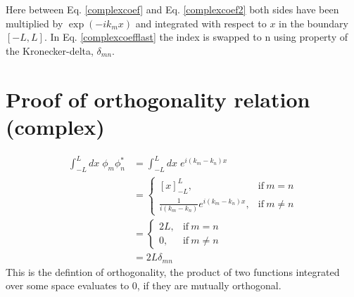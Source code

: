 \documentclass{article}
\begin{document}
Here between Eq. \ref{complexcoef} and Eq. \ref{complexcoef2} both sides have been multiplied by $\exp(-ik_mx)$ and integrated with respect to $x$ in the boundary $\left [-L ,L\right ]$. In Eq. \ref{complexcoefflast} the index is swapped to n using property of the Kronecker-delta, $\delta_{mn}$.

\newpage
\section{Proof of orthogonality relation (complex)} \label{sec:ortho}
\begin{align*}
    \int_{-L}^{L} dx \;\phi_m \phi_n^* &= \int_{-L}^{L} dx \;e^{i(k_m-k_n)x}\\
    &=\begin{cases}
      \left [x \right]^L_{-L}, & \text{if}\ m=n \\
      \frac{1}{i(k_m-k_n)}e^{i(k_m-k_n)x}, & \text{if}\ m\neq n
    \end{cases} \\
    &=\begin{cases}
      2L, & \text{if}\ m=n \\
      0, & \text{if}\ m\neq n
    \end{cases}\\
    &= 2L\delta_{mn}
\end{align*}
This is the defintion of orthogonality, the product of two functions integrated over some space evaluates to 0, if they are mutually orthogonal.

\newpage
\end{document}
